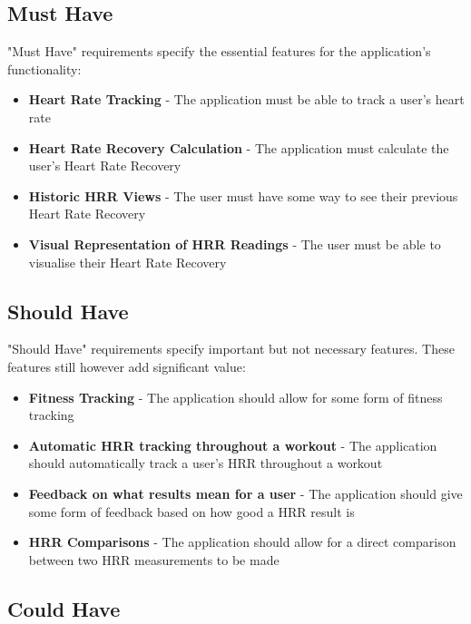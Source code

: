 \documentclass{l4proj}
\begin{document}
\subsection{Must Have}

"Must Have" requirements specify the essential features for the application's functionality:

\begin{itemize}
    \item \textbf{Heart Rate Tracking} - The application must be able to track a user's heart rate
    \item \textbf{Heart Rate Recovery Calculation} - The application must calculate the user's Heart Rate Recovery
    \item \textbf{Historic HRR Views} - The user must have some way to see their previous Heart Rate Recovery 
    \item \textbf{Visual Representation of HRR Readings} - The user must be able to visualise their Heart Rate Recovery
\end{itemize}

\subsection{Should Have}

"Should Have" requirements specify important but not necessary features. These features still however add significant value:

\begin{itemize}
    \item \textbf{Fitness Tracking} - The application should allow for some form of fitness tracking
    \item \textbf{Automatic HRR tracking throughout a workout} - The application should automatically track a user's HRR throughout a workout
    \item \textbf{Feedback on what results mean for a user} - The application should give some form of feedback based on how good a HRR result is
    \item \textbf{HRR Comparisons} - The application should allow for a direct comparison between two HRR measurements to be made 
    
\end{itemize}

\subsection{Could Have}
\end{document}
